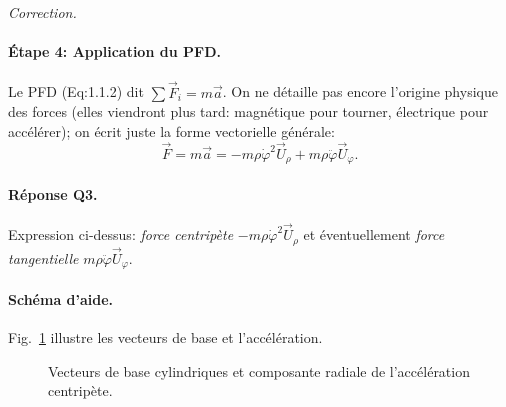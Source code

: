 \documentclass[11pt,a4paper]{article}
\newenvironment{correction}{
    \par\begingroup
    \color{blue!60!black}
    \smallskip\noindent\textit{Correction.}\quad
}{\par\medskip\endgroup}
\begin{document}
\begin{correction}
\paragraph{Étape 4: Application du PFD.} Le PFD (Eq:1.1.2) dit $\sum \vec F_i = m\vec a$. On ne détaille pas encore l'origine physique des forces (elles viendront plus tard: magnétique pour tourner, électrique pour accélérer); on écrit juste la forme vectorielle générale:
\[
\vec F = m\vec a = -m\rho \dot\varphi^{2}\vec U_{\rho} + m\rho\ddot\varphi\vec U_{\varphi}.
\]
\paragraph{Réponse Q3.} Expression ci-dessus: \emph{force centripète} $-m\rho \dot\varphi^{2}\vec U_{\rho}$ et éventuellement \emph{force tangentielle} $m\rho\ddot\varphi\vec U_{\varphi}$.

\paragraph{Schéma d'aide.} Fig.~\ref{fig:correction-cercle} illustre les vecteurs de base et l'accélération.
\begin{figure}[h]\centering
{}
\caption{Vecteurs de base cylindriques et composante radiale de l'accélération centripète.}
\label{fig:correction-cercle}
\end{figure}
\end{correction}
\end{document}
